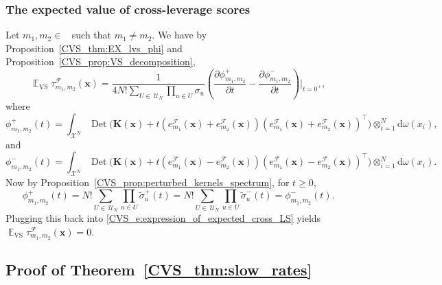 \documentclass[twoside,11pt]{book}
\numberwithin{theorem}{chapter}
\numberwithin{definition}{chapter}
\numberwithin{proposition}{chapter}
\numberwithin{corollary}{chapter}
\numberwithin{example}{chapter}
\numberwithin{lemma}{chapter}
\numberwithin{assumption}{chapter}
\numberwithin{equation}{chapter}
\numberwithin{figure}{chapter}
\DeclareMathOperator{\Det}{Det}
\DeclareMathOperator{\VS}{\mathrm{VS}}
\DeclareMathOperator{\Tran}{\intercal}
\DeclareMathOperator{\EX}{\mathbb{E}}
\DeclareMathOperator{\F}{\mathcal{F}}
\DeclareMathOperator{\Ns}{\mathbb{N}^{*}}
\def\UN{\:\mathcal{U}_N}
\newcommand{\rb}[1]{\textcolor{magenta}{#1}}
\begin{document}
\subsubsection{The expected value of cross-leverage scores}
Let $m_{1},m_{2} \in \Ns$ such that $m_{1} \neq m_{2}$. We have by Proposition~\ref{CVS_thm:EX_lvs_phi} and Proposition~\ref{CVS_prop:VS_decomposition},
\begin{equation}
\EX_{\VS} \tau_{m_{1},m_{2}}^{\F}(\bm{x})  = \frac{1}{4N!\sum\limits_{U\in\UN} \prod\limits_{u \in U}\sigma_{u}} \left( \frac{\partial \phi_{m_{1},m_{2}}^{+}}{ \partial t } - \frac{\partial \phi_{m_{1},m_{2}}^{-}}{ \partial t }\right)\bigg|_{t = 0^{+}} ,
\label{CVS_e:expression_of_expected_cross_LS}
\end{equation}
where
\begin{equation}
\phi_{m_{1},m_{2}}^{+}(t) =  \int_{\mathcal{X}^{N}} \Det \bigg(\bm{K}(\bm{x})+t \left(e_{m_{1}}^{\mathcal{F}}(\bm{x}) + e_{m_{2}}^{\mathcal{F}}(\bm{x}) \right) \left(e_{m_{1}}^{\mathcal{F}}(\bm{x}) + e_{m_{2}}^{\mathcal{F}}(\bm{x}) \right)^{\Tran} \bigg) \otimes_{i =1}^{N} \mathrm{d}\omega(x_{i}),
\end{equation}
and
\begin{equation}
\phi_{m_{1},m_{2}}^{-}(t) =  \int_{\mathcal{X}^{N}} \Det \bigg(\bm{K}(\bm{x})+t \left(e_{m_{1}}^{\mathcal{F}}(\bm{x}) - e_{m_{2}}^{\mathcal{F}}(\bm{x}) \right) \left(e_{m_{1}}^{\mathcal{F}}(\bm{x}) - e_{m_{2}}^{\mathcal{F}}(\bm{x}) \right)^{\Tran} \bigg) \otimes_{i =1}^{N} \mathrm{d}\omega(x_{i}).
\end{equation}
Now by Proposition~\ref{CVS_prop:perturbed_kernels_spectrum}, for $t\geq 0$,
\begin{equation}
\phi_{m_{1},m_{2}}^{+}(t) = N!\sum\limits_{U\in\UN} \prod\limits_{u \in U} \tilde{\sigma}_{u}^{+}(t) = N!\sum\limits_{U\in\UN} \prod\limits_{u \in U} \tilde{\sigma}_{u}^{-}(t) = \phi_{m_{1},m_{2}}^{-}(t).
\end{equation}
Plugging this back into \eqref{CVS_e:expression_of_expected_cross_LS} yields $\EX_{\VS} \tau_{m_{1},m_{2}}^{\F}(\bm{x}) = 0$.

\subsection{Proof of Theorem~\ref{CVS_thm:slow_rates}}\label{CVS_app:proof_slow_rates}
\end{document}
